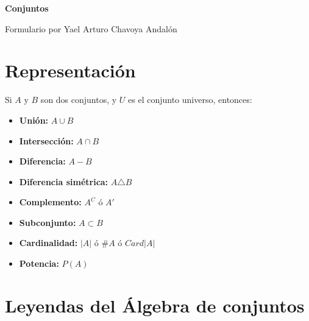 \documentclass{article}
\begin{document}
    \centerline{\Huge{\textbf{Conjuntos}}}
    \centerline{\large{Formulario por Yael Arturo Chavoya Andalón}}

    \section{Representación}
    Si $A$ y $B$ son dos conjuntos, y $U$ es el conjunto universo, entonces:
    
    \begin{multicols}{2}
        \begin{itemize}
            \item \textbf{Unión:} $A \cup B$
            \item \textbf{Intersección:} $A \cap B$
            \item \textbf{Diferencia:} $A - B$
            \item \textbf{Diferencia simétrica:} $A \triangle B$
            \item \textbf{Complemento:} $A^C$ ó $A'$
            \item \textbf{Subconjunto:} $A \subset B$
            \item \textbf{Cardinalidad:} $|A|$ ó $\#A$ ó $Card |A|$
            \item \textbf{Potencia:} $P(A)$
        \end{itemize}
    \end{multicols}

    \section{Leyendas del Álgebra de conjuntos}
\end{document}
